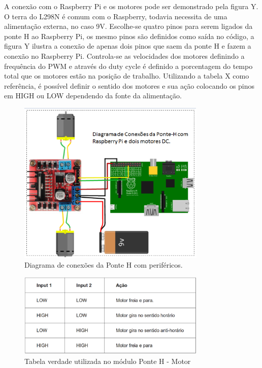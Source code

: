 A conexão com o Raspberry Pi e os motores pode ser demonstrado pela figura Y. O terra do L298N é comum com o Raspberry, todavia necessita de uma alimentação externa, no caso 9V. Escolhe-se quatro pinos para serem ligados da ponte H ao Raspberry Pi, os mesmo pinos são definidos como saída no código, a figura Y ilustra a conexão de apenas dois pinos que saem da ponte H e fazem a conexão no Raspberry Pi. Controla-se as velocidades dos motores definindo a frequência do PWM e através do duty cycle é definido a porcentagem do tempo total que os motores estão na posição de trabalho. Utilizando a tabela X como referência, é possível definir o sentido dos motores e sua ação colocando os pinos em HIGH ou LOW  dependendo da fonte da alimentação. 

\begin{figure}[H]
    \centering
    \includegraphics[width=0.8\textwidth]{figuras/esquematico_componentes.eps}
    \caption{Diagrama de conexões da Ponte H com periféricos.}
    \label{fig:catia01}
\end{figure}

\begin{figure}[H]
    \centering
    \includegraphics[width=0.8\textwidth]{figuras/tabela_ponte_H_2.eps}
    \caption{Tabela verdade utilizada no módulo Ponte H - Motor}
    \label{fig:catia01}
\end{figure}

